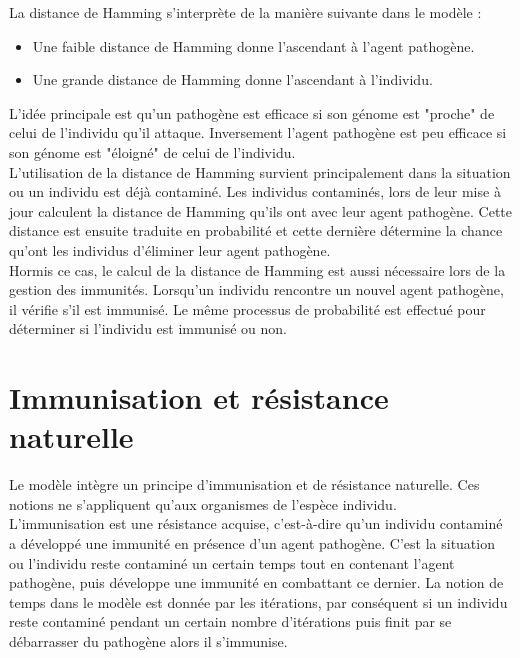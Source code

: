 La distance de Hamming s’interprète de la manière suivante dans le modèle :

\begin{itemize}
	\item Une faible distance de Hamming donne l'ascendant à l'agent pathogène.
	\item Une grande distance de Hamming donne l'ascendant à l'individu.
\end{itemize}

L'idée principale est qu'un pathogène est efficace si son génome est "proche" de celui de l'individu qu'il attaque. Inversement l'agent pathogène est peu efficace si son génome est "éloigné" de celui de l'individu.\\

L'utilisation de la distance de Hamming survient principalement dans la situation ou un individu est déjà contaminé. Les individus contaminés, lors de leur mise à jour calculent la distance de Hamming qu'ils ont avec leur agent pathogène. Cette distance est ensuite traduite en probabilité et cette dernière détermine la chance qu'ont les individus d'éliminer leur agent pathogène.\\

Hormis ce cas, le calcul de la distance de Hamming est aussi nécessaire lors de la gestion des immunités. Lorsqu'un individu rencontre un nouvel agent pathogène, il vérifie s'il est immunisé. Le même processus de probabilité est effectué pour déterminer si l'individu est immunisé ou non.

\section{Immunisation et résistance naturelle}

Le modèle intègre un principe d'immunisation et de résistance naturelle. Ces notions ne s'appliquent qu'aux organismes de l'espèce individu.\\

L'immunisation est une résistance acquise, c'est-à-dire qu'un individu contaminé a développé une immunité en présence d'un agent pathogène. C'est la situation ou l'individu reste contaminé un certain temps tout en contenant l'agent pathogène, puis développe une immunité en combattant ce dernier. La notion de temps dans le modèle est donnée par les itérations, par conséquent si un individu reste contaminé pendant un certain nombre d'itérations puis finit par se débarrasser du pathogène alors il s'immunise.\\

